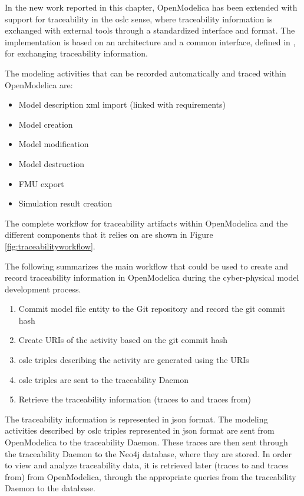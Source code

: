 In the new work reported in this chapter, OpenModelica has been extended with support for traceability in the \acrshort{oslc} sense, 
where traceability information is exchanged with external tools through a standardized interface and format. The implementation is based on
an architecture and a common interface, defined in \cite{intocpskenneth}, for exchanging traceability information. 

The modeling activities that can be recorded automatically and traced within OpenModelica are:

\begin{itemize}
\item Model description \acrshort{xml} import (linked with requirements)
\item Model creation
\item Model modification
\item Model destruction
\item FMU export
\item Simulation result creation

\end{itemize}
The complete workflow for traceability artifacts within OpenModelica and the different components that it relies on are shown in Figure \ref{fig:traceabilityworkflow}.

The following summarizes the main workflow that could be used to create and record traceability
information in OpenModelica during the cyber-physical model development process.

\begin{enumerate}
\item Commit model file entity to the Git repository and record the git commit hash
\item Create URIs of the activity based on the git commit hash
\item \acrshort{oslc} triples describing the activity are generated using the URIs
\item \acrshort{oslc} triples are sent to the traceability Daemon
\item Retrieve the traceability information (traces to and traces from)

\end{enumerate}

The traceability information is represented in \acrshort{json} format. The modeling activities described by \acrshort{oslc}
triples represented in \acrshort{json} format are sent from OpenModelica to the traceability Daemon. These traces are then
sent through the traceability Daemon to the Neo4j database, where they are stored. In order to view and analyze
traceability data, it is retrieved later (traces to and traces from) from OpenModelica, through the
appropriate queries from the traceability Daemon to the database. 

